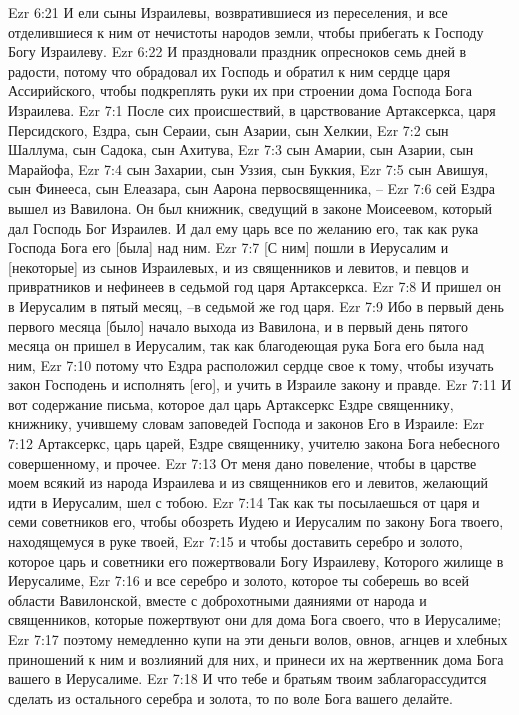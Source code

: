 Ezr 6:21  И ели сыны Израилевы, возвратившиеся из переселения, и все отделившиеся к ним от нечистоты народов земли, чтобы прибегать к Господу Богу Израилеву.
Ezr 6:22  И праздновали праздник опресноков семь дней в радости, потому что обрадовал их Господь и обратил к ним сердце царя Ассирийского, чтобы подкреплять руки их при строении дома Господа Бога Израилева.
Ezr 7:1  После сих происшествий, в царствование Артаксеркса, царя Персидского, Ездра, сын Сераии, сын Азарии, сын Хелкии,
Ezr 7:2  сын Шаллума, сын Садока, сын Ахитува,
Ezr 7:3  сын Амарии, сын Азарии, сын Марайофа,
Ezr 7:4  сын Захарии, сын Уззия, сын Буккия,
Ezr 7:5  сын Авишуя, сын Финееса, сын Елеазара, сын Аарона первосвященника, --
Ezr 7:6  сей Ездра вышел из Вавилона. Он был книжник, сведущий в законе Моисеевом, который дал Господь Бог Израилев. И дал ему царь все по желанию его, так как рука Господа Бога его [была] над ним.
Ezr 7:7  [С ним] пошли в Иерусалим и [некоторые] из сынов Израилевых, и из священников и левитов, и певцов и привратников и нефинеев в седьмой год царя Артаксеркса.
Ezr 7:8  И пришел он в Иерусалим в пятый месяц, --в седьмой же год царя.
Ezr 7:9  Ибо в первый день первого месяца [было] начало выхода из Вавилона, и в первый день пятого месяца он пришел в Иерусалим, так как благодеющая рука Бога его была над ним,
Ezr 7:10  потому что Ездра расположил сердце свое к тому, чтобы изучать закон Господень и исполнять [его], и учить в Израиле закону и правде.
Ezr 7:11  И вот содержание письма, которое дал царь Артаксеркс Ездре священнику, книжнику, учившему словам заповедей Господа и законов Его в Израиле:
Ezr 7:12  Артаксеркс, царь царей, Ездре священнику, учителю закона Бога небесного совершенному, и прочее.
Ezr 7:13  От меня дано повеление, чтобы в царстве моем всякий из народа Израилева и из священников его и левитов, желающий идти в Иерусалим, шел с тобою.
Ezr 7:14  Так как ты посылаешься от царя и семи советников его, чтобы обозреть Иудею и Иерусалим по закону Бога твоего, находящемуся в руке твоей,
Ezr 7:15  и чтобы доставить серебро и золото, которое царь и советники его пожертвовали Богу Израилеву, Которого жилище в Иерусалиме,
Ezr 7:16  и все серебро и золото, которое ты соберешь во всей области Вавилонской, вместе с доброхотными даяниями от народа и священников, которые пожертвуют они для дома Бога своего, что в Иерусалиме;
Ezr 7:17  поэтому немедленно купи на эти деньги волов, овнов, агнцев и хлебных приношений к ним и возлияний для них, и принеси их на жертвенник дома Бога вашего в Иерусалиме.
Ezr 7:18  И что тебе и братьям твоим заблагорассудится сделать из остального серебра и золота, то по воле Бога вашего делайте.
